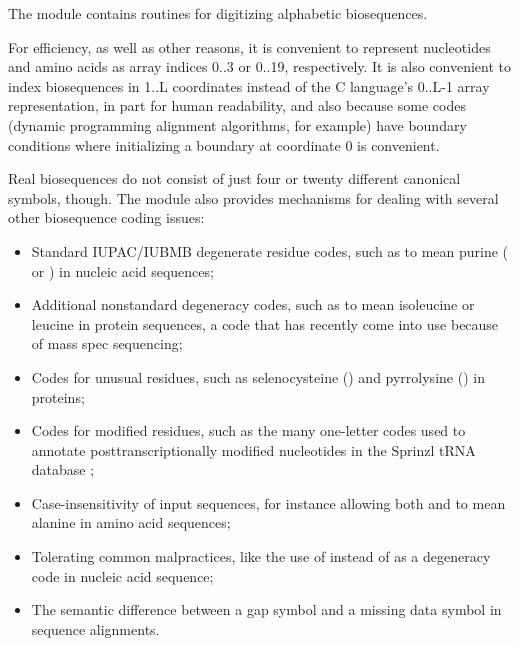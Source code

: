 The  module contains routines for digitizing
alphabetic biosequences.

For efficiency, as well as other reasons, it is convenient to
represent nucleotides and amino acids as array indices 0..3 or 0..19,
respectively. It is also convenient to index biosequences in 1..L
coordinates instead of the C language's 0..L-1 array representation,
in part for human readability, and also because some codes (dynamic
programming alignment algorithms, for example) have boundary
conditions where initializing a boundary at coordinate 0 is
convenient.

Real biosequences do not consist of just four or twenty different
canonical symbols, though. The  module also provides
mechanisms for dealing with several other biosequence coding issues:

\begin{itemize}
  \item Standard IUPAC/IUBMB degenerate residue codes, such as
        to mean purine ( or ) in nucleic
       acid sequences;

  \item Additional nonstandard degeneracy codes, such as  to
        mean isoleucine or leucine  in protein sequences, a
        code that has recently come into use because of mass spec
        sequencing;

  \item Codes for unusual residues, such as selenocysteine ()
        and pyrrolysine () in proteins;

  \item Codes for modified residues, such as the many one-letter codes
        used to annotate posttranscriptionally modified nucleotides in
        the Sprinzl tRNA database \citep{Sprinzl98};

  \item Case-insensitivity of input sequences, for instance allowing
        both  and  to mean alanine in amino acid
        sequences;

  \item Tolerating common malpractices, like the use of 
       instead of  as a degeneracy code in nucleic acid
       sequence;

  \item The semantic difference between a gap symbol and a missing
        data symbol in sequence alignments.
\end{itemize}        

